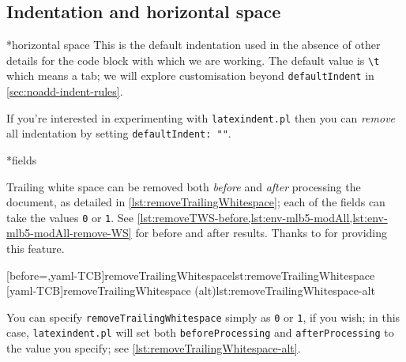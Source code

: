 \documentclass[10pt]{article}
\begin{document}


\subsection{Indentation and horizontal space}\label{subsec:indentation:and:horizontal:space}
*{horizontal space}
 This is the default indentation used in the absence of other details for the code block
 with which we are working. The default value is \lstinline!\t! which means a tab; we
 will explore customisation beyond \texttt{defaultIndent} in
 \vref{sec:noadd-indent-rules}.

 If you're interested in experimenting with \texttt{latexindent.pl} then you can
 \emph{remove} all indentation by setting \texttt{defaultIndent: ""}.

*{fields}\label{yaml:removeTrailingWhitespace}

 Trailing white space can be removed both \emph{before} and \emph{after} processing the
 document, as detailed in \cref{lst:removeTrailingWhitespace}; each of the fields can
 take the values \texttt{0} or \texttt{1}. See
 \vref{lst:removeTWS-before,lst:env-mlb5-modAll,lst:env-mlb5-modAll-remove-WS} for before
 and after results. Thanks to \cite{vosskuhle} for providing this feature.

 \begin{cmhtcbraster}
  [before=\centering,yaml-TCB]{removeTrailingWhitespace}{lst:removeTrailingWhitespace}
  [yaml-TCB]{removeTrailingWhitespace (alt)}{lst:removeTrailingWhitespace-alt}
 \end{cmhtcbraster}

 You can specify \texttt{removeTrailingWhitespace} simply as \texttt{0} or \texttt{1}, if
 you wish; in this case, 
 \texttt{latexindent.pl} will set both \texttt{beforeProcessing} and
 \texttt{afterProcessing} to the value you specify; see
 \cref{lst:removeTrailingWhitespace-alt}.%
\end{document}
